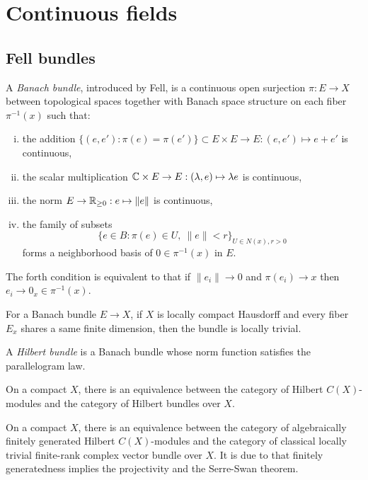 \documentclass{../../large}
\begin{document}
\chapter{Continuous fields}


\section{Fell bundles}

\begin{prb}
A \emph{Banach bundle}, introduced by Fell, is a continuous open surjection $\pi:E\to X$ between topological spaces together with Banach space structure on each fiber $\pi^{-1}(x)$ such that:
\begin{enumerate}[(i)]
\item the addition $\{(e,e'):\pi(e)=\pi(e')\}\subset E\times E\to E:(e,e')\mapsto e+e'$ is continuous,
\item the scalar multiplication $\mathbb{C}\times E\to E:(\lambda,e)\mapsto\lambda e$ is continuous,
\item the norm $E\to\mathbb{R}_{\ge0}:e\mapsto\|e\|$ is continuous,
\item the family of subsets
\[\{e\in B:\pi(e)\in U,\ \|e\|<r\}_{U\in N(x),r>0}\]
forms a neighborhood basis of $0\in\pi^{-1}(x)$ in $E$.
\end{enumerate}
The forth condition is equivalent to that if $\|e_i\|\to0$ and $\pi(e_i)\to x$ then $e_i\to 0_x\in\pi^{-1}(x)$.
\begin{parts}
\item For a Banach bundle $E\to X$, if $X$ is locally compact Hausdorff and every fiber $E_x$ shares a same finite dimension, then the bundle is locally trivial.
\end{parts}
\end{prb}


\begin{prb}
\end{prb}



\begin{prb}
A \emph{Hilbert bundle} is a Banach bundle whose norm function satisfies the parallelogram law.

\begin{parts}
\item On a compact $X$, there is an equivalence between the category of Hilbert $C(X)$-modules and the category of Hilbert bundles over $X$.
\item On a compact $X$, there is an equivalence between the category of algebraically finitely generated Hilbert $C(X)$-modules and the category of classical locally trivial finite-rank complex vector bundle over $X$.
It is due to that finitely generatedness implies the projectivity and the Serre-Swan theorem.
\end{parts}
\end{prb}
\end{document}
